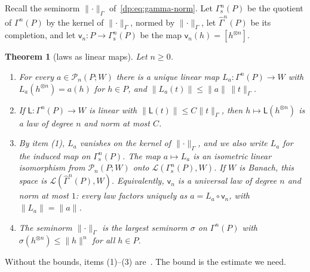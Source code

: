 \documentclass[11pt]{amsart}
\newtheorem{theorem}{Theorem}[section]
\theoremstyle{definition}
\theoremstyle{remark}
\numberwithin{equation}{section}
\newcommand{\cL}{\mathcal L}
\newcommand{\norm}[1]{\lVert #1\rVert}
\theoremstyle{plain}
\theoremstyle{definition}
\theoremstyle{plain}
\newcommand{\hGamma}{\widehat\Gamma}
\newcommand{\cP}{\mathcal P}
\begin{document}
Recall the seminorm $\norm\cdot_\Gamma$ of~\eqref{dp:eq:gamma-norm}. Let $\Gamma^n_{\mathrm s}(P)$ be the quotient of $\Gamma^n(P)$ by the kernel of $\norm\cdot_\Gamma$, normed by $\norm\cdot_\Gamma$, let $\hGamma^n(P)$ be its completion, and let $\mathsf v_n\colon P\to\Gamma^n_{\mathrm s}(P)$ be the map $\mathsf v_n(h)=[h^{\otimes n}]$.

\begin{theorem}[laws as linear maps]\label{dp:thm:normed-roby}
Let $n\ge0$.
\begin{enumerate}
\item For every $a\in\cP_n(P;W)$ there is a unique linear map $L_a\colon\Gamma^n(P)\to W$ with $L_a(h^{\otimes n})=a(h)$ for $h\in P$, and $\norm{L_a(t)}\le\norm a\,\norm t_\Gamma$.
\item If $\mathsf L\colon\Gamma^n(P)\to W$ is linear with $\norm{\mathsf L(t)}\le C\norm t_\Gamma$, then $h\mapsto\mathsf L(h^{\otimes n})$ is a law of degree $n$ and norm at most $C$.
\item By item (1), $L_a$ vanishes on the kernel of $\norm\cdot_\Gamma$, and we also write $L_a$ for the induced map on $\Gamma^n_{\mathrm s}(P)$. The map $a\mapsto L_a$ is an isometric linear isomorphism from $\cP_n(P;W)$ onto $\cL(\Gamma^n_{\mathrm s}(P),W)$. If $W$ is Banach, this space is $\cL(\hGamma^n(P),W)$. Equivalently, $\mathsf v_n$ is a universal law of degree $n$ and norm at most $1$: every law factors uniquely as $a=L_a\circ\mathsf v_n$, with $\norm{L_a}=\norm a$.
\item The seminorm $\norm\cdot_\Gamma$ is the largest seminorm $\sigma$ on $\Gamma^n(P)$ with $\sigma(h^{\otimes n})\le\norm h^n$ for all $h\in P$.
\end{enumerate}
\end{theorem}

Without the bounds, items (1)--(3) are~\cite[Th.~IV.1, Prop.~IV.5]{Ro}. The bound is the estimate we need.
\end{document}

